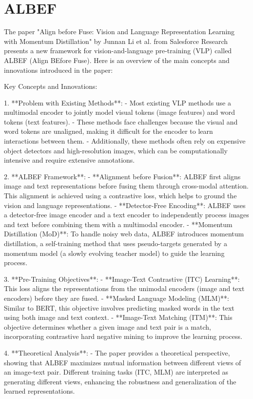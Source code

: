 \section{ALBEF}
The paper "Align before Fuse: Vision and Language Representation Learning with Momentum Distillation" by Junnan Li et al. from Salesforce Research presents a new framework for vision-and-language pre-training (VLP) called ALBEF (Align BEfore Fuse). Here is an overview of the main concepts and innovations introduced in the paper:

 Key Concepts and Innovations:

1. **Problem with Existing Methods**:
   - Most existing VLP methods use a multimodal encoder to jointly model visual tokens (image features) and word tokens (text features).
   - These methods face challenges because the visual and word tokens are unaligned, making it difficult for the encoder to learn interactions between them.
   - Additionally, these methods often rely on expensive object detectors and high-resolution images, which can be computationally intensive and require extensive annotations.

2. **ALBEF Framework**:
   - **Alignment before Fusion**: ALBEF first aligns image and text representations before fusing them through cross-modal attention. This alignment is achieved using a contrastive loss, which helps to ground the vision and language representations.
   - **Detector-Free Encoding**: ALBEF uses a detector-free image encoder and a text encoder to independently process images and text before combining them with a multimodal encoder.
   - **Momentum Distillation (MoD)**: To handle noisy web data, ALBEF introduces momentum distillation, a self-training method that uses pseudo-targets generated by a momentum model (a slowly evolving teacher model) to guide the learning process.

3. **Pre-Training Objectives**:
   - **Image-Text Contrastive (ITC) Learning**: This loss aligns the representations from the unimodal encoders (image and text encoders) before they are fused.
   - **Masked Language Modeling (MLM)**: Similar to BERT, this objective involves predicting masked words in the text using both image and text context.
   - **Image-Text Matching (ITM)**: This objective determines whether a given image and text pair is a match, incorporating contrastive hard negative mining to improve the learning process.

4. **Theoretical Analysis**:
   - The paper provides a theoretical perspective, showing that ALBEF maximizes mutual information between different views of an image-text pair. Different training tasks (ITC, MLM) are interpreted as generating different views, enhancing the robustness and generalization of the learned representations.

